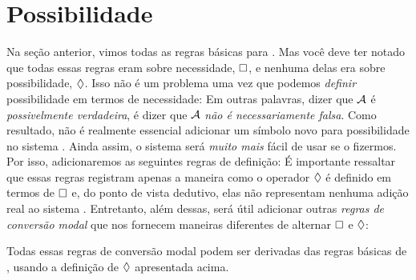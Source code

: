 \section{Possibilidade}
\label{possibility}

Na seção anterior, vimos todas as regras básicas para \mlK. Mas você deve ter notado que todas essas regras eram sobre necessidade,  $\Box$, e nenhuma delas era sobre possibilidade, $\Diamond$. Isso não é um problema uma vez que podemos \emph{definir} possibilidade em termos de necessidade:
Em outras palavras, dizer que $\mathcal{A}$ é \emph{possivelmente verdadeira}, é dizer que $\mathcal{A}$   \emph{não é necessariamente falsa}. Como resultado, não é realmente essencial adicionar um símbolo novo para possibilidade  no sistema \mlK. Ainda assim, o sistema será \emph{muito mais} fácil de usar se o fizermos. Por isso, adicionaremos as seguintes regras de definição:
É importante ressaltar que essas regras registram apenas a maneira como  o operador $\Diamond$  é definido em termos de $\Box$ e, do ponto de vista dedutivo, elas não representam nenhuma adição real ao sistema \mlK. Entretanto, além dessas,  será útil adicionar outras \emph{regras de conversão modal} que nos fornecem maneiras  diferentes de alternar  $\Box$  e $\Diamond$:
 

Todas essas regras de conversão modal podem ser derivadas das regras básicas de \mlK, usando a  definição de $\Diamond$ apresentada acima. 


